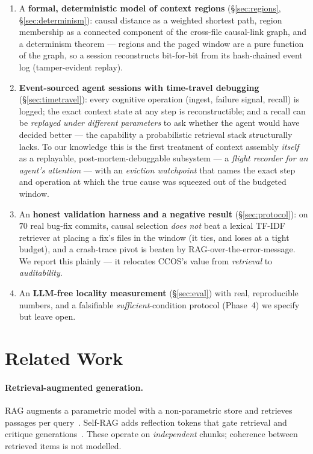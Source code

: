 \documentclass[11pt]{article}
\begin{document}
\begin{enumerate}
  \item A \textbf{formal, deterministic model of context regions}
  (\S\ref{sec:regions}, \S\ref{sec:determinism}): causal distance as a weighted
  shortest path, region membership as a connected component of the cross-file
  causal-link graph, and a determinism theorem --- regions and the paged window
  are a pure function of the graph, so a session reconstructs bit-for-bit from its
  hash-chained event log (tamper-evident replay).
  \item \textbf{Event-sourced agent sessions with time-travel debugging}
  (\S\ref{sec:timetravel}): every cognitive operation (ingest, failure signal,
  recall) is logged; the exact context state at any step is reconstructible; and a
  recall can be \emph{replayed under different parameters} to ask whether the agent
  would have decided better --- the capability a probabilistic retrieval stack
  structurally lacks. To our knowledge this is the first treatment of context
  assembly \emph{itself} as a replayable, post-mortem-debuggable subsystem --- a
  \emph{flight recorder for an agent's attention} --- with an \emph{eviction
  watchpoint} that names the exact step and operation at which the true cause was
  squeezed out of the budgeted window.
  \item An \textbf{honest validation harness and a negative result}
  (\S\ref{sec:protocol}): on $70$ real bug-fix commits, causal selection
  \emph{does not} beat a lexical TF-IDF retriever at placing a fix's files in the
  window (it ties, and loses at a tight budget), and a crash-trace pivot is beaten
  by RAG-over-the-error-message. We report this plainly --- it relocates CCOS's
  value from \emph{retrieval} to \emph{auditability}.
  \item An \textbf{LLM-free locality measurement} (\S\ref{sec:eval}) with real,
  reproducible numbers, and a falsifiable \emph{sufficient}-condition protocol
  (Phase~4) we specify but leave open.
\end{enumerate}

\section{Related Work}\label{sec:related}

\paragraph{Retrieval-augmented generation.} RAG augments a parametric model with
a non-parametric store and retrieves passages per
query~\cite{lewis2020rag}. Self-RAG adds reflection tokens that gate
retrieval and critique generations~\cite{asai2023selfrag}. These operate on
\emph{independent} chunks; coherence between retrieved items is not modelled.
\end{document}
